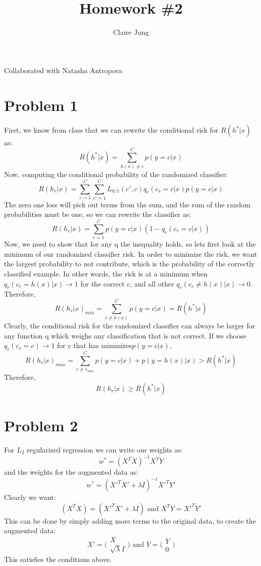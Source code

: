 \documentclass[]{article}
\title{Homework \#2}
\author{Claire Jung}
\begin{document}
\maketitle
Collaborated with Natasha Antropova
\section*{Problem 1}
First, we know from class that we can rewrite the conditional risk for $R(h^*|x)$ as:
\[
R(h^*|x) = \sum_{h(x)\neq c}^{C}p(y=c|x)
\]
Now, computing the conditional probability of the randomized classifier:
\[
R(h_r|x) = \sum_{c=1}^C\sum_{c'=1}^{C} L_{0/1}(c',c)q_r(c_r=c|x)p(y=c|x)
\]
The zero one loss will pick out terms from the sum, and the sum of the random probabilities must be one, so we can rewrite the classifier as:
\[
R(h_r|x) = \sum_{c=1}^{C}p(y=c|x)(1-q_r(c_r=c|x))
\]
Now, we need to show that for any q the inequality holds, so lets first look at the minimum of our randomized classifier risk. In order to minimize the risk, we want the largest probability to not contribute, which is the probability of the correctly classified example. In other words, the risk is at a minimum when $q_r(c_r=h(x)|x)\rightarrow1$ for the correct c, and all other $q_r(c_r\neq h(x)|x)\rightarrow 0$.
Therefore,
\[
R(h_r|x)_{min} = \sum_{c\neq h(x)}^{C}p(y=c|x) = R(h^*|x)
\]
Clearly, the conditional risk for the randomized classifier can always be larger for any function q which weighs any classification that is not correct. If we choose $q_r(c_r=c)\rightarrow 1$ for c that has minimizes$p(y=c|x)$,
\[
R(h_r|x)_{max} = \sum_{c\neq c_{min}}^{C}p(y=c|x) +p(y=h(x)|x) > R(h^*|x)
\]
Therefore,
\[
R(h_r|x) \geq R(h^*|x)
\]
\section*{Problem 2}
For $L_2$ regularized regression we can write our weights as:
\[
w^* = (X^TX)^{-1}X^TY
\]
and the weights for the augmented data as:
\[
w^* = (X'^TX'+\lambda I)^{-1}X'^TY'
\]
Clearly we want:
\[
(X^TX) = (X'^TX'+\lambda I) \text{ and } X^TY=X'^TY'
\]
This can be done by simply adding more terms to the original data, to create the augmented data:
\[
X' = \Big(\begin{matrix}
X \\ \sqrt{\lambda}I
\end{matrix}\Big) \text{ and } Y = \Big(\begin{matrix}
Y \\ 0
\end{matrix}\Big)
\]
This satisfies the conditions above. 
\end{document}
